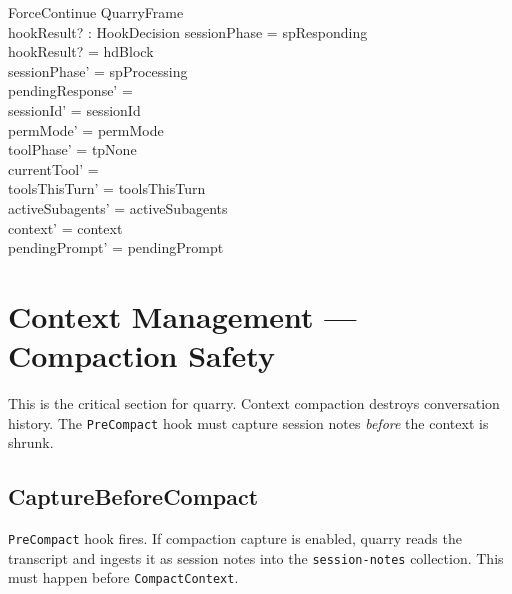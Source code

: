\documentclass[a4paper,10pt,fleqn]{article}
\begin{document}
\begin{schema}{ForceContinue}
  QuarryFrame \\
  hookResult? : HookDecision
  \where
  sessionPhase = spResponding \\
  hookResult? = hdBlock \\
  sessionPhase' = spProcessing \\
  pendingResponse' = \emptyset \\
  sessionId' = sessionId \\
  permMode' = permMode \\
  toolPhase' = tpNone \\
  currentTool' = \emptyset \\
  toolsThisTurn' = toolsThisTurn \\
  activeSubagents' = activeSubagents \\
  context' = context \\
  pendingPrompt' = pendingPrompt
\end{schema}

\section{Context Management --- Compaction Safety}

This is the critical section for quarry. Context compaction destroys
conversation history. The \texttt{PreCompact} hook must capture
session notes \emph{before} the context is shrunk.

\subsection{CaptureBeforeCompact}

\texttt{PreCompact} hook fires. If compaction capture is enabled,
quarry reads the transcript and ingests it as session notes into
the \texttt{session-notes} collection. This must happen before
\texttt{CompactContext}.
\end{document}
